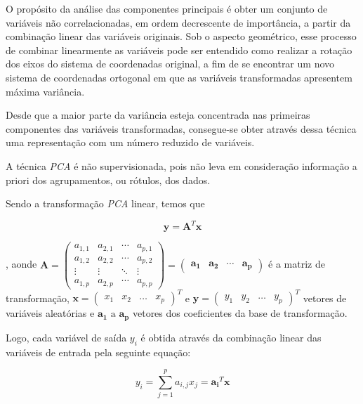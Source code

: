 O propósito da análise das componentes principais é obter um conjunto de variáveis não correlacionadas, em ordem decrescente de importância, a partir da combinação linear das variáveis originais. Sob o aspecto geométrico, esse processo de combinar linearmente as variáveis pode ser entendido como realizar a rotação dos eixos do sistema de coordenadas original, a fim de se encontrar um novo sistema de coordenadas ortogonal em que as variáveis transformadas apresentem máxima variância. 

Desde que a maior parte da variância esteja concentrada nas primeiras componentes das variáveis transformadas, consegue-se obter através dessa técnica uma representação com um número reduzido de variáveis.

A técnica \emph{PCA} é não supervisionada, pois não leva em consideração informação a priori dos agrupamentos, ou rótulos, dos dados.  

Sendo a transformação \emph{PCA} linear, temos que

\begin{equation}\label{eq:PCA1}
\mathbf{y}=\mathbf{A}^T\mathbf{x}
\end{equation}

, aonde $ \mathbf{A} = \begin{pmatrix}
  a_{1,1} & a_{2,1} & \cdots & a_{p,1} \\
  a_{1,2} & a_{2,2} & \cdots & a_{p,2} \\
  \vdots  & \vdots  & \ddots & \vdots  \\
  a_{1,p} & a_{2,p} & \cdots & a_{p,p}
 \end{pmatrix} = 
 \begin{pmatrix}
 \mathbf{a_{1}}&
 \mathbf{a_{2}}&
 \cdots&
 \mathbf{a_{p}}
 \end{pmatrix}$ é a matriz de transformação, $\mathbf{x} = \begin{pmatrix} x_1&x_2&\ldots&x_p\end{pmatrix}^T$ e $\mathbf{y} = \begin{pmatrix}y_1&y_2&\ldots&y_p\end{pmatrix}^T$ vetores de variáveis aleatórias e $\mathbf{a_1}\text{ a }\mathbf{a_p}$ vetores dos coeficientes da base de transformação.
 
Logo, cada variável de saída $y_i$ é obtida através da combinação linear das variáveis de entrada pela seguinte equação:
 
 \begin{equation}\label{eq:PCA2}
 y_i = \sum\limits_{j = 1}^p a_{i,j}x_j = \mathbf{a_i}^T\mathbf{x}
 \end{equation}

